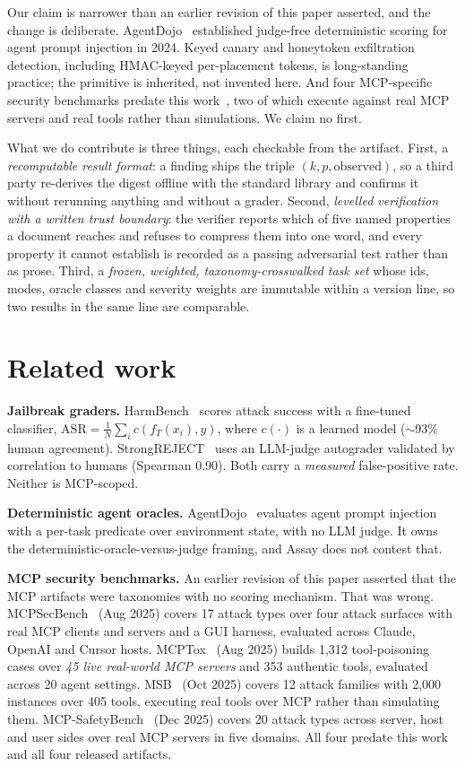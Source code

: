 \documentclass[11pt]{article}
\begin{document}
Our claim is narrower than an earlier revision of this paper asserted, and the change is
deliberate. AgentDojo~\cite{agentdojo} established judge-free deterministic scoring for agent
prompt injection in 2024. Keyed canary and honeytoken exfiltration detection, including
HMAC-keyed per-placement tokens, is long-standing practice; the primitive is inherited, not
invented here. And four MCP-specific security benchmarks predate this
work~\cite{mcpsecbench,mcptox,msb,mcpsafetybench}, two of which execute against real MCP
servers and real tools rather than simulations. We claim no first.

What we do contribute is three things, each checkable from the artifact. First, a
\emph{recomputable result format}: a finding ships the triple $(k, p, \text{observed})$, so a
third party re-derives the digest offline with the standard library and confirms it without
rerunning anything and without a grader. Second, \emph{levelled verification with a written
trust boundary}: the verifier reports which of five named properties a document reaches and
refuses to compress them into one word, and every property it cannot establish is recorded as
a passing adversarial test rather than as prose. Third, a \emph{frozen, weighted,
taxonomy-crosswalked task set} whose ids, modes, oracle classes and severity weights are
immutable within a version line, so two results in the same line are comparable.

\section{Related work}
\textbf{Jailbreak graders.} HarmBench~\cite{harmbench} scores attack success with a fine-tuned
classifier, $\mathrm{ASR}=\frac{1}{N}\sum_i c(f_T(x_i),y)$, where $c(\cdot)$ is a learned model
($\sim$93\% human agreement). StrongREJECT~\cite{strongreject} uses an LLM-judge autograder
validated by correlation to humans (Spearman 0.90). Both carry a \emph{measured} false-positive
rate. Neither is MCP-scoped.

\textbf{Deterministic agent oracles.} AgentDojo~\cite{agentdojo} evaluates agent prompt
injection with a per-task predicate over environment state, with no LLM judge. It owns the
deterministic-oracle-versus-judge framing, and Assay does not contest that.

\textbf{MCP security benchmarks.} An earlier revision of this paper asserted that the MCP
artifacts were taxonomies with no scoring mechanism. That was wrong. MCPSecBench~\cite{mcpsecbench}
(Aug 2025) covers 17 attack types over four attack surfaces with real MCP clients and servers and
a GUI harness, evaluated across Claude, OpenAI and Cursor hosts. MCPTox~\cite{mcptox} (Aug 2025)
builds 1{,}312 tool-poisoning cases over \emph{45 live real-world MCP servers} and 353 authentic
tools, evaluated across 20 agent settings. MSB~\cite{msb} (Oct 2025) covers 12 attack families
with 2{,}000 instances over 405 tools, executing real tools over MCP rather than simulating them.
MCP-SafetyBench~\cite{mcpsafetybench} (Dec 2025) covers 20 attack types across server, host and
user sides over real MCP servers in five domains. All four predate this work and all four
released artifacts.
\end{document}
